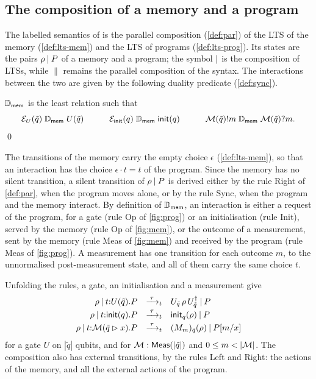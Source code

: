 \subsection{The composition of a memory and a program}

The labelled semantics of \lqCCS is the parallel composition
(\cref{def:par}) of the LTS of the memory (\cref{def:lts-mem}) and the LTS
of programs (\cref{def:lts-prog}). Its states are the pairs
$\rho \mathbin{|} P$ of a memory and a program; the symbol $\mathbin{|}$ is the
composition of LTSs, while $\parallel$ remains the parallel composition of
the syntax. The interactions between the two are given by the following
duality predicate (\cref{def:sync}).

\begin{definition}\label{def:sync-lq}
$\mathrel{\mathbb{D}_{\mathsf{mem}}}$ is the least relation such that
\[
\mathcal{E}_U(\tilde q) \mathrel{\mathbb{D}_{\mathsf{mem}}} U(\tilde q)
\qquad\quad
\mathcal{E}_{\mathsf{init}}(q) \mathrel{\mathbb{D}_{\mathsf{mem}}} \mathsf{init}(q)
\qquad\quad
\mathcal{M}(\tilde q)!m \mathrel{\mathbb{D}_{\mathsf{mem}}} \mathcal{M}(\tilde q)?m.
\]
\qed
\end{definition}

The transitions of the memory carry the empty choice $\epsilon$
(\cref{def:lts-mem}), so that an interaction has the choice $\epsilon \cdot t = t$ of the program. Since the
memory has no silent transition, a silent transition of $\rho \mathbin{|} P$ is
derived either by the rule Right of \cref{def:par}, when the program moves
alone, or by the rule Sync, when the program and the memory interact.
By definition of $\mathrel{\mathbb{D}_{\mathsf{mem}}}$, an interaction is either a request of the
program, for a gate (rule Op of \cref{fig:prog}) or an initialisation (rule
Init), served by the memory (rule Op of \cref{fig:mem}), or the outcome of a
measurement, sent by the memory (rule Meas of \cref{fig:mem}) and received
by the program (rule Meas of \cref{fig:prog}). A measurement has one transition for each outcome $m$, to the unnormalised
post-measurement state, and all of them carry the same choice $t$.

Unfolding the rules, a gate, an initialisation and a measurement give
\[
\begin{array}{rcl}
\rho \mathbin{|} t{:}U(\tilde q).P &\xrightarrow{\;\tau\;}_{t}& U_{\tilde q}\,\rho\,U_{\tilde q}^{\dagger} \mathbin{|} P\\[2pt]
\rho \mathbin{|} t{:}\mathsf{init}(q).P &\xrightarrow{\;\tau\;}_{t}& \mathsf{init}_{q}(\rho) \mathbin{|} P\\[2pt]
\rho \mathbin{|} t{:}\mathcal{M}(\tilde q \rhd x).P &\xrightarrow{\;\tau\;}_{t}& (M_m)_{\tilde q}(\rho) \mathbin{|} P[m/x]
\end{array}
\]
for a gate $U$ on $|\tilde q|$ qubits, and for $\mathcal{M} : \mathsf{Meas}(|\tilde q|)$ and
$0 \le m < |\mathcal{M}|$. The composition also has external transitions, by the rules
Left and Right: the actions of the memory, and all the external actions of
the program.
